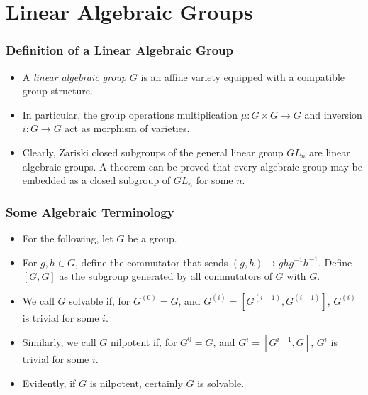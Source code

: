 \documentclass{beamer}
\theoremstyle{remark}
\begin{document}
\section{Linear Algebraic Groups}
\begin{frame}
  \frametitle{Definition of a Linear Algebraic Group} 
  \begin{itemize}
  \item A \emph{linear algebraic group} $G$ is an affine variety equipped with a compatible group structure.
    \pause
  \item In particular, the group operations multiplication $\mu: G \times G \to G$ and inversion $i: G \to G$ act as morphism of varieties.   \pause
  \item Clearly, Zariski closed subgroups of the general linear group $GL_n$ are linear algebraic groups. A theorem can be proved that every algebraic group may be embedded as a closed subgroup of $GL_n$ for some $n$.
  \end{itemize} 
\end{frame}

\begin{frame}
\frametitle{Some Algebraic Terminology}
\begin{itemize}
\item For the following, let $G$ be a group.
\pause
\item For $g, h \in G$, define the commutator that sends $(g,h) \mapsto gh g^{-1}h^{-1}$. Define $[G, G]$ as the subgroup generated by all commutators of $G$ with $G$.
\pause
\item We call $G$ solvable if, for $G^{(0)} = G$, and $G^{(i)} = [ G^{(i-1)}, G^{(i-1)}]$, $G^{(i)}$ is trivial for some $i$.
\pause
\item Similarly, we call $G$ nilpotent if, for $G^0 = G$, and $G^i = [ G^{i-1}, G]$, $G^i$ is trivial for some $i$.
\pause
\item Evidently, if $G$ is nilpotent, certainly $G$ is solvable. %
\end{itemize}
\end{frame}
\end{document}
